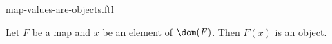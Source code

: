 \documentclass{stex}
\begin{document}
\begin{smodule}{map-values-are-objects.ftl}
  \begin{flemma*}
    Let $F$ be a map and $x$ be an element of $\dom(F)$.
    Then $F(x)$ is an object.
  \end{flemma*}
\end{smodule}
\end{document}
